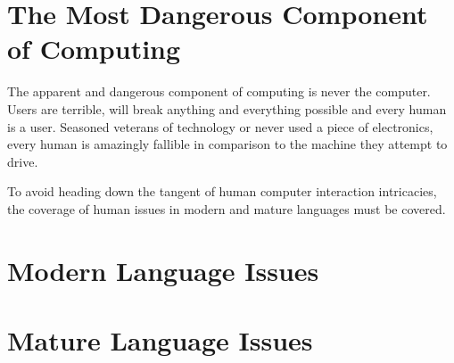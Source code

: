 \documentclass[
    a4paper,
    12pt,
    headings=normal
]{scrreprt}
\begin{document}
    \newpage

    \section{The Most Dangerous Component of Computing}
    The apparent and dangerous component of computing is never the computer. Users are terrible,
    will break anything and everything possible and every human is a user. Seasoned veterans of
    technology or never used a piece of electronics, every human is amazingly fallible in comparison 
    to the machine they attempt to drive.

    To avoid heading down the tangent of human computer interaction intricacies, the coverage of
    human issues in modern and mature languages must be covered.

    \newpage

    \section{Modern Language Issues}

    \newpage
    \section{Mature Language Issues}

    \newpage
    \printbibliography

    
\end{document}
